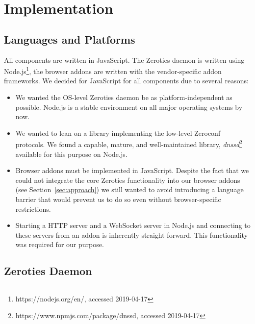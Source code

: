 \section{Implementation}
\label{sec:implementation}

\subsection{Languages and Platforms}
\label{sub:languages_and_platforms}

All components are written in JavaScript. 
The Zeroties daemon is written using Node.js\footnote{https://nodejs.org/en/, accessed 2019-04-17}, the browser addons are written with the vendor-specific addon frameworks.
We decided for JavaScript for all components due to several reasons:
\begin{itemize}
\item We wanted the OS-level Zeroties daemon be as platform-independent as possible. 
Node.js is a stable environment on all major operating systems by now.
\item We wanted to lean on a library implementing the low-level Zeroconf protocols.
We found a capable, mature, and well-maintained library, \textit{dnssd}\footnote{https://www.npmjs.com/package/dnssd, accessed 2019-04-17} available for this purpose on Node.js.
\item Browser addons must be implemented in JavaScript.
Despite the fact that we could not integrate the core Zeroties functionality into our browser addons (see Section~\ref{sec:approach}) we still wanted to avoid  introducing a language barrier that would prevent us to do so even without browser-specific restrictions.
\item Starting a HTTP server and a WebSocket server in Node.js and connecting to these servers from an addon is inherently straight-forward.
This functionality was required for our purpose.
\end{itemize}

\subsection{Zeroties Daemon}
\label{sub:zeroties_daemon}

